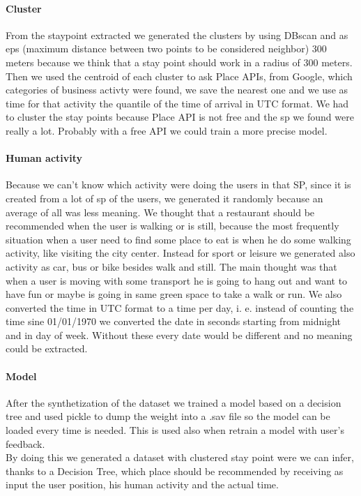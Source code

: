 \documentclass[../../main]{subfiles}
\begin{document}
\paragraph{Cluster}
From the staypoint extracted we generated the clusters by using DBscan and as eps (maximum distance between two points to be considered neighbor) 
300 meters because we think that a stay point should work in a radius of 300 meters. Then we used the centroid of each cluster to ask Place APIs, from Google, 
which categories of business activty were found, we save the nearest one and we use as time for that activity the quantile of the time of arrival in UTC format.
We had to cluster the stay points because Place API is not free and the sp we found were really a lot. Probably with a free API we could train a more precise model.

\paragraph{Human activity}
Because we can't know which activity were doing the users in that SP, since it is created from a lot of sp of the users, we generated it randomly 
because an average of all was less meaning. We thought that a restaurant should be recommended when the user is walking or is still, because
the most frequently situation when a user need to find some place to eat is when he do some walking activity, like visiting the city center.
Instead for sport or leisure we generated also activity as car, bus or bike besides walk and still. The main thought was that when a user is moving with 
some transport he is going to hang out and want to have fun or maybe is going in same green space to take a walk or run.
We also converted the time in UTC format to a time per day, i. e. instead of counting the time sine 01/01/1970 we converted the date in seconds starting from midnight and 
in day of week. Without these every date would be different and no meaning could be extracted.

\paragraph{Model}
After the synthetization of the dataset we trained a model based on a decision tree and used pickle to dump the weight into a .sav file so the model can be loaded 
every time is needed. This is used also when retrain a model with user's feedback.
\\
By doing this we generated a dataset with clustered stay point were we can infer, thanks to a Decision Tree, which place should be recommended by 
receiving as input the user position, his human activity and the actual time.
\end{document}
